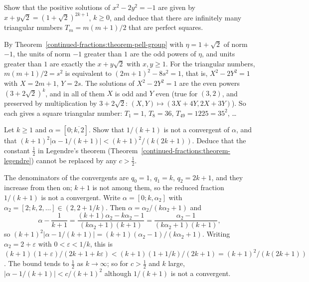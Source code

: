 \begin{exercise}\label{continued-fractions:exercise-pell-two}
Show that the positive solutions of $x^2 - 2y^2 = -1$ are given by $x + y\sqrt2 = (1 + \sqrt2)^{2k+1}$, $k \geq 0$, and deduce that there are infinitely many triangular numbers $T_m = m(m + 1)/2$ that
are perfect squares.
\end{exercise}

\begin{solution}
By Theorem~\ref{continued-fractions:theorem-pell-group} with $\eta = 1 + \sqrt2$ of norm $-1$, the units of norm $-1$ greater than $1$ are the odd powers of $\eta$, and units greater than $1$ are exactly
the $x + y\sqrt2$ with $x, y \geq 1$. For the triangular numbers, $m(m + 1)/2 = s^2$ is equivalent to $(2m + 1)^2 - 8s^2 = 1$, that is, $X^2 - 2Y^2 = 1$ with $X = 2m + 1$, $Y = 2s$. The solutions of
$X^2 - 2Y^2 = 1$ are the even powers $(3 + 2\sqrt2)^k$, and in all of them $X$ is odd and $Y$ even (true for $(3, 2)$, and preserved by multiplication by $3 + 2\sqrt2$: $(X, Y) \mapsto (3X + 4Y, 2X + 3Y)$).
So each gives a square triangular number: $T_1 = 1$, $T_8 = 36$, $T_{49} = 1225 = 35^2$, \ldots
\end{solution}

\begin{exercise}\label{continued-fractions:exercise-legendre-sharp}
Let $k \geq 1$ and $\alpha = [0; \overline{k, 2}]$. Show that $1/(k + 1)$ is not a convergent of $\alpha$, and that $(k + 1)^2|\alpha - 1/(k + 1)| < (k + 1)^2/(k(2k + 1))$. Deduce that the constant
$\frac12$ in Legendre's theorem (Theorem~\ref{continued-fractions:theorem-legendre}) cannot be replaced by any $c > \frac12$.
\end{exercise}

\begin{solution}
The denominators of the convergents are $q_0 = 1$, $q_1 = k$, $q_2 = 2k + 1$, and they increase from then on; $k + 1$ is not among them, so the reduced fraction $1/(k + 1)$ is not a convergent. Write
$\alpha = [0; k, \alpha_2]$ with $\alpha_2 = [2; k, 2, \ldots] \in (2, 2 + 1/k)$. Then $\alpha = \alpha_2/(k\alpha_2 + 1)$ and
\[
\alpha - \frac{1}{k + 1} = \frac{(k + 1)\alpha_2 - k\alpha_2 - 1}{(k\alpha_2 + 1)(k + 1)} = \frac{\alpha_2 - 1}{(k\alpha_2 + 1)(k + 1)},
\]
so $(k + 1)^2|\alpha - 1/(k + 1)| = (k + 1)(\alpha_2 - 1)/(k\alpha_2 + 1)$. Writing $\alpha_2 = 2 + \varepsilon$ with $0 < \varepsilon < 1/k$, this is
$(k + 1)(1 + \varepsilon)/(2k + 1 + k\varepsilon) < (k + 1)(1 + 1/k)/(2k + 1) = (k + 1)^2/(k(2k + 1))$. The bound tends to $\frac12$ as $k \to \infty$; so for $c > \frac12$ and $k$ large,
$|\alpha - 1/(k + 1)| < c/(k + 1)^2$ although $1/(k + 1)$ is not a convergent.
\end{solution}

